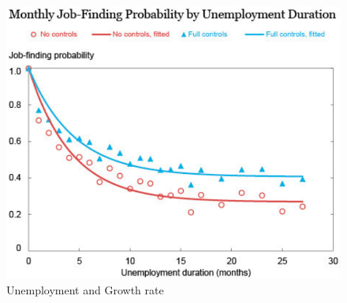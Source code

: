 \begin{figure}[H]
   \centering
   \includegraphics[scale = 0.5]{figures/Unemployment_Time}
   \caption{Unemployment and Growth rate \cite{Unemployment_effect_unemployed}}
 \end{figure}

